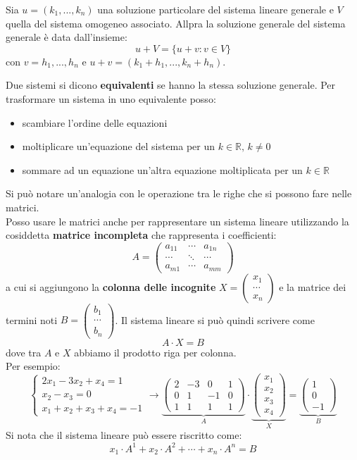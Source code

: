 \documentclass[a4paper,12pt, oneside]{book}
\begin{document}
\begin{teorema}
Sia $u=(k_1,...,k_n)$ una soluzione particolare del sistema lineare generale e $V$ quella del sistema omogeneo associato. Allpra la soluzione generale del sistema generale è data dall'insieme:
$$u+V=\{u+v:v\in V\}$$
con $v=h_1,...,h_n$ e $u+v=(k_1+h_1,...,k_n+h_n)$.
\end{teorema}
Due sistemi si dicono \textbf{equivalenti} se hanno la stessa soluzione generale. Per trasformare un sistema in uno equivalente posso:
\begin{itemize}
\item scambiare l'ordine delle equazioni
\item moltiplicare un'equazione del sistema per un $k\in \mathbb{R},\, k\neq 0$
\item sommare ad un equazione un'altra equazione moltiplicata per un $k\in \mathbb{R}$
\end{itemize}
Si può notare un'analogia con le operazione tra le righe che si possono fare nelle matrici. \\
Posso usare le matrici anche per rappresentare un sistema lineare utilizzando la cosiddetta \textbf{matrice incompleta} che rappresenta i coefficienti: $$
A=\left(\begin{matrix}
a_{11} & \cdots & a_{1n}\\
\cdots & \ddots & \cdots\\
a_{m1} & \cdots & a_{mm}
\end{matrix}\right)
$$ a cui si aggiungono la \textbf{colonna delle incognite} $
X=\left(\begin{matrix}
x_1\\
\cdots	\\
x_n
\end{matrix}\right)
$ e la matrice dei termini noti $
B=\left(\begin{matrix}
b_1\\
\cdots	\\
b_n
\end{matrix}\right)
$. 
Il sistema lineare si può quindi scrivere come $$A\cdot X=B$$
dove tra $A$ e $X$ abbiamo il prodotto riga per colonna.\\
Per esempio:
$$
\begin{cases}
2x_1-3x_2+x_4=1\\
x_2-x_3=0\\
x_1+x_2+x_3+x_4=-1
\end{cases}\rightarrow
\underbrace{\left(\begin{matrix}
2 & -3 & 0 & 1\\
0 & 1 & -1 & 0\\
1 & 1 & 1 &1
\end{matrix}\right)}_{A}\cdot
\underbrace{\left(\begin{matrix}
x_1\\
x_2\\
x_3\\
x_4
\end{matrix}\right)}_{X}=
\underbrace{\left(\begin{matrix}
1\\
0\\
-1
\end{matrix}\right)}_{B}
$$
Si nota che il sistema lineare può essere riscritto come:
$$x_1\cdot A^1+x_2\cdot A^2+\cdots + x_n\cdot A^n=B$$ 
\end{document}
